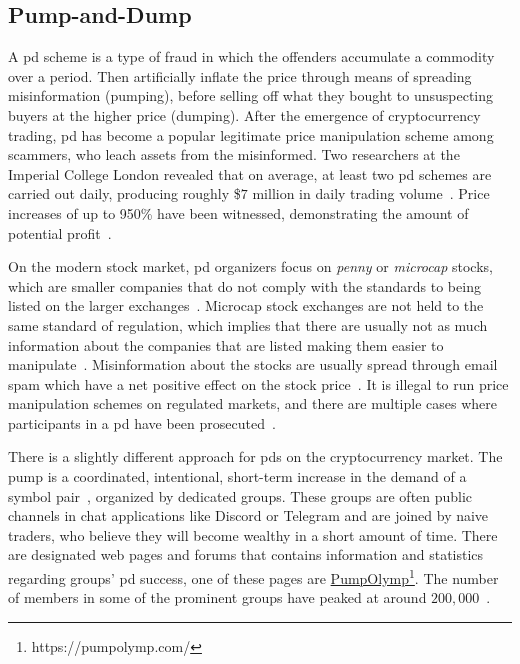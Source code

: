 \subsection{Pump-and-Dump}\label{sec:pd}
A \ac{pd} scheme is a type of fraud in which the offenders accumulate a commodity over a period. Then artificially inflate the price through means of spreading misinformation (pumping), before selling off what they bought to unsuspecting buyers at the higher price (dumping)\cite{P&D_to_the_moon}. After the emergence of cryptocurrency trading, \ac{pd} has become a popular legitimate price manipulation scheme among scammers, who leach assets from the misinformed. Two researchers at the Imperial College London revealed that on average, at least two \ac{pd} schemes are carried out daily, producing roughly \$$7$ million in daily trading volume~\cite{P&D_MIT_crypto}. Price increases of up to 950\% have been witnessed, demonstrating the amount of potential profit~\cite{P&D_cointelegraph}.



On the modern stock market, \ac{pd} organizers focus on \emph{penny} or \emph{microcap} stocks, which are smaller companies that do not comply with the standards to being listed on the larger exchanges~\cite{stock_bouraoui, stock_temple, P&D_anatomy}. Microcap stock exchanges are not held to the same standard of regulation, which implies that there are usually not as much information about the companies that are listed making them easier to manipulate~\cite{P&D_to_the_moon}. Misinformation about the stocks are usually spread through email spam which have a net positive effect on the stock price~\cite{stock_bouraoui}. It is illegal to run price manipulation schemes on regulated markets, and there are multiple cases where participants in a \ac{pd} have been prosecuted~\cite{P&D_to_the_moon}.

There is a slightly different approach for \acp{pd} on the cryptocurrency market. The pump is a coordinated, intentional, short-term increase in the demand of a symbol pair~\cite{P&D_anatomy}, organized by dedicated groups. These groups are often public channels in chat applications like Discord or Telegram and are joined by naive traders, who believe they will become wealthy in a short amount of time. There are designated web pages and forums that contains information and statistics regarding groups' \ac{pd} success, one of these pages are \href{https://pumpolymp.com/}{PumpOlymp}\footnote{https://pumpolymp.com/}. The number of members in some of the prominent groups have peaked at around $200,000$~\cite{P&D_the_outline}.

